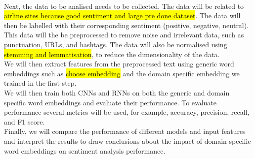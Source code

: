 \documentclass[10pt,journal]{IEEEtran}
\begin{document}
\\Next, the data to be analised needs to be collected. The data will be related to \hl{airline sites because good sentiment and large pre done dataset}. The data will then be labelled with their corresponding sentiment (positive, negative, neutral).
\\This data will the be preprocessed to remove noise and irrelevant data, such as punctuation, URLs, and hashtags. The data will also be normalised using \hl{stemming and lemmatisation}, to reduce the dimensionality of the data.
\\We will then extract features from the preprocessed text using generic word embeddings such as \hl{choose embedding} and the domain specific embedding we trained in the first step.
\\We will then train both CNNs and RNNs on both the generic and domain specific word embeddings and evaluate their performance. To evaluate performance several metrics will be used, for example, accuracy, precision, recall, and F1 score.
\\Finally, we will compare the performance of different models and input features and interpret the results to draw conclusions about the impact of domain-specific word embeddings on sentiment analysis performance.

 

\end{document}
